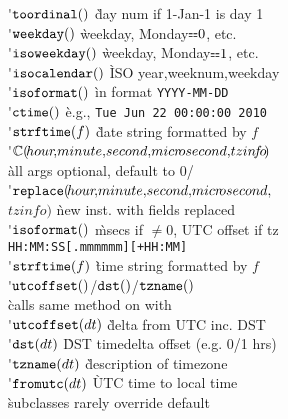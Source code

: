 \begin{tabbing}
\'$\mathop{\mathtt{toordinal}}()$ \` day num if 1-Jan-1 is day 1 \\
\'$\mathop{\mathtt{weekday}}()$ \` weekday, Monday$\eq 0$, etc. \\
\'$\mathop{\mathtt{isoweekday}}()$ \` weekday, Monday$\eq 1$, etc. \\
\'$\mathop{\mathtt{isocalendar}}()$ \` ISO {\small year,weeknum,weekday} \\
\'$\mathop{\mathtt{isoformat}}()$ \` in format \verb.YYYY-MM-DD. \\
\'$\mathop{\mathtt{ctime}}()$ \` e.g., \verb.Tue Jun 22 00:00:00 2010. \\
\'$\mathop{\mathtt{strftime}}(f)$ \` date string formatted by $f$ \\
\'$\class(\!hour\!,\!minute,\!second,\!micr\!osecond,\!tzin\!f\!o\!)$ \\
\` all args optional, default to 0/ \\
\'$\mathop{\mathtt{replace}}(\!hour\!,\!minute,\!second,\!micr\!osecond,$\\
\>$tzin\!f\!o)$ \` new inst. with fields replaced \\
\'$\mathop{\mathtt{isoformat}}()$ \` msecs if $\!\neq\!0$, UTC offset if tz \\ \` \texttt{HH$\!$:$\!$MM$\!$:$\!$SS[$\!$.mmmmmm]$\!$[+HH$\!$:$\!$MM]} \\
\'$\mathop{\mathtt{strftime}}(f)$ \` time string formatted by $f$ \\
\'$\mathop{\mathtt{utcoffset}}()$/$\mathop{\mathtt{dst}}()$/$\mathop{\mathtt{tzname}}()$ \\ \` calls same method on  with  \\
\'$\mathop{\mathtt{utcoffset}}(dt)$ \` delta from UTC inc. DST \\
\'$\mathop{\mathtt{dst}}(dt)$ \` DST timedelta offset ($\!$e.g. 0$\!$/$\!$1 hrs$\!$) \\
\'$\mathop{\mathtt{tzname}}(dt)$ \` description of timezone \\
\'$\mathop{\mathtt{fromutc}}(dt)$ \` UTC time to local time \\ \` subclasses rarely override default
\end{tabbing}

